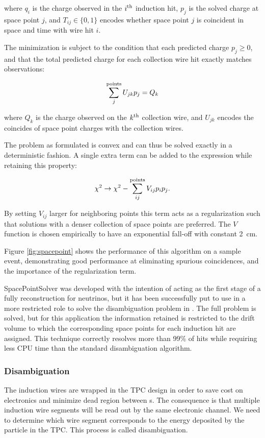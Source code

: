 where $q_i$ is the charge observed in the $i^{\rm th}$ induction hit, $p_j$ is the solved charge at space point $j$, and $T_{ij}\in\{0,1\}$ encodes whether space point $j$ is coincident in space and time with wire hit $i$.

The minimization is subject to the condition that each predicted charge $p_j\ge0$, and that the total predicted charge for each collection wire hit exactly matches observations:

\begin{equation}
\sum_j^{\rm points}U_{jk}p_j=Q_k
\end{equation}

where $Q_k$ is the charge observed on the $k^{\rm th}$ collection wire, and $U_{jk}$ encodes the coincides of space point charges with the collection wires.

The problem as formulated is convex and can thus be solved exactly in a deterministic fashion. A single extra term can be added to the expression while retaining this property:

\begin{equation}
\chi^2 \to \chi^2 - \sum_{ij}^{\rm points}V_{ij}p_ip_j .
\end{equation}

By setting $V_{ij}$ larger for neighboring points this term acts as a regularization such that solutions with a denser collection of space points are preferred. The $V$ function is chosen empirically to have an exponential fall-off with constant \SI{2}{cm}.

Figure \ref{fig:spacepoint} shows the performance of this algorithm on a sample   event, demonstrating good performance at eliminating spurious coincidences, and the importance of the regularization term.

SpacePointSolver was developed with the intention of acting as the first stage of a fully \threed reconstruction for  neutrinos, but it has been successfully put to use in a more restricted role to solve the disambiguation problem in . The full problem is solved, but for this application the information retained is restricted to the drift volume to which the corresponding space points for each induction hit are assigned. This technique correctly resolves more than 99\% of hits while requiring less CPU time than the standard disambiguation algorithm.

\subsubsection{Disambiguation}
The induction wires are wrapped in the  TPC design in order to save cost on electronics and minimize dead region between s. The consequence is that multiple induction wire segments will be read out by the same electronic channel. We need to determine which wire segment corresponds to the energy deposited by the particle in the TPC. This process is called disambiguation. 

